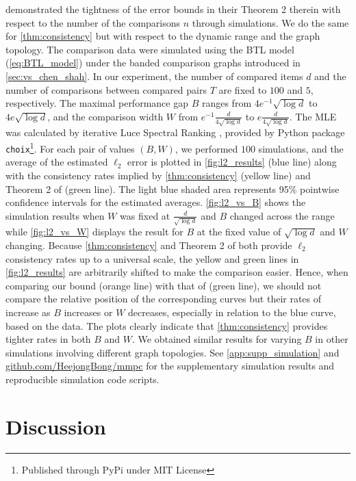 \citet{shah2016estimation} demonstrated the tightness of the error bounds in their Theorem 2 therein with respect to the number of the comparisons $n$ through simulations. We do the same for \ref{thm:consistency} but with respect to the dynamic range and the graph topology. The comparison data were simulated using  the BTL model (\ref{eq:BTL_model}) under the banded comparison graphs introduced in \ref{sec:vs_chen_shah}. In our experiment, the number of compared items $d$ and the number of comparisons between compared pairs $T$ are fixed to $100$ and $5$, respectively. The maximal performance gap $B$  ranges from $4 e^{-1} \sqrt{\log d}$ to $4 e \sqrt{\log d}$, and the comparison width $W$  from $e^{-1} \frac{d}{4 \sqrt{\log d}}$ to $e \frac{d}{4 \sqrt{\log d}}$. The MLE was calculated by iterative Luce Spectral Ranking \citep{maystre2015fast}, provided by Python package \texttt{choix}\footnote{Published through PyPi under MIT License}. For each pair of values $(B, W)$, we performed $100$ simulations, and the average of the estimated $\ell_2$ error is plotted in \ref{fig:l2_results} (blue line) along with the consistency rates implied by \ref{thm:consistency} (yellow line) and Theorem 2 of \citet{shah2016estimation} (green line). The light blue shaded area represents 95\% pointwise confidence intervals for the estimated averages. \ref{fig:l2_vs_B} shows the simulation results when $W$ was fixed at $\frac{d}{\sqrt{\log d}}$ and $B$ changed across the range while \ref{fig:l2_vs_W} displays the result for $B$ at the fixed value of $\sqrt{\log d}$ and $W$ changing. Because \ref{thm:consistency} and Theorem 2 of \citet{shah2016estimation} both provide $\ell_2$ consistency rates up to a universal scale, the yellow and green lines in \ref{fig:l2_results} are arbitrarily shifted to make the comparison easier. Hence, when comparing our bound (orange line) with that of \cite{shah2016estimation} (green line), we should not compare the relative position of the corresponding curves but their rates of increase as $B$ increases or $W$ decreases, especially in relation to the blue curve, based on the data. The plots clearly indicate that \ref{thm:consistency} provides tighter rates in both $B$ and $W$. We obtained similar results for varying  $B$ in other simulations involving different graph topologies. See \ref{app:supp_simulation} and \url{github.com/HeejongBong/mmpc} for the supplementary simulation results and reproducible simulation code scripts. 

\section{Discussion} \label{sec:discussion}

